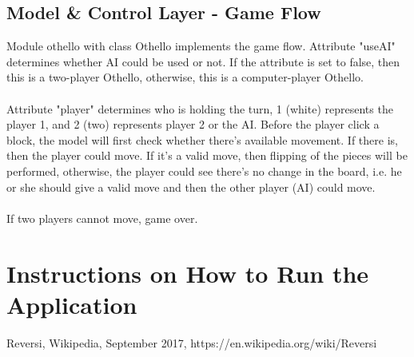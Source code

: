 \documentclass[letterpaper,12pt]{article}
\begin{document}
\subsection{Model \& Control Layer - Game Flow}
Module othello with class Othello implements the game flow. Attribute "useAI" determines whether AI could be used or not. If the attribute is set to false, then this is a two-player Othello, otherwise, this is a computer-player Othello.\\\\
\noindent
Attribute "player" determines who is holding the turn, 1 (white) represents the player 1, and 2 (two) represents player 2 or the AI. Before the player click a block, the model will first check whether there's available movement. If there is, then the player could move. If it's a valid move, then flipping of the pieces will be performed, otherwise, the player could see there's no change in the board, i.e. he or she should give a valid move and then the other player (AI) could move.\\\\
\noindent
If two players cannot move, game over.

\section{Instructions on How to Run the Application}


\begin{thebibliography}{}
\bibitem{}
Reversi, Wikipedia, September 2017, https://en.wikipedia.org/wiki/Reversi
\end{thebibliography}
\end{document}

